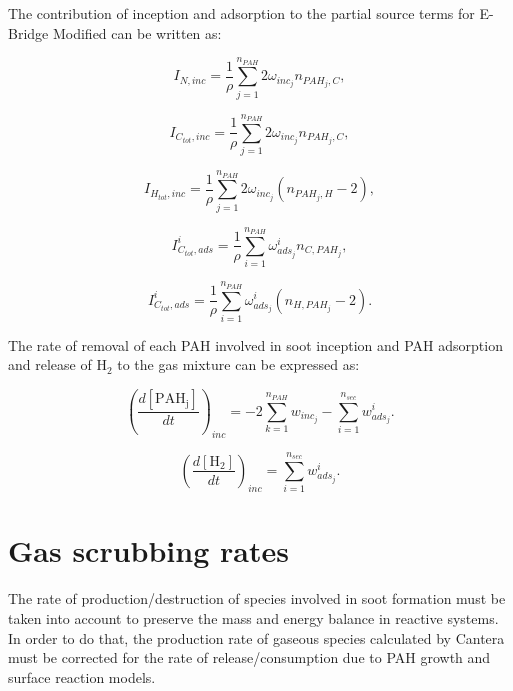 The contribution of inception and adsorption to the partial source terms for E-Bridge Modified can be written as:

\begin{equation}
	I_{N,{inc}} = \frac{1}{\rho}
	\sum_{j=1}^{n_{PAH}}
	2\omega_{inc_{j}} 
	n_{PAH_j,C}
	\label{eqn:IN_inc_ebri},
\end{equation}

\begin{equation}
	I_{C_{tot},{inc}} = \frac{1}{\rho}
	\sum_{j=1}^{n_{PAH}}
	2\omega_{inc_{j}} 
	n_{PAH_j,C}
	\label{eqn:ICtot_inc_ebri},
\end{equation}

\begin{equation}
	I_{H_{tot},{inc}} = \frac{1}{\rho}
	\sum_{j=1}^{n_{PAH}}
	2\omega_{inc_{j}} 
	\left(
	n_{PAH_j,H}-2
	\right)
	\label{eqn:IHtot_inc_ebri},
\end{equation}

\begin{equation}
	I^i_{C_{tot},ads} =
	\frac{1}{\rho}
	\sum_{i=1}^{n_{PAH}}
	\omega^i_{ads_j}
	n_{C,PAH_j}
	\label{eqn:ICtotads_ebri},
\end{equation}

\begin{equation}
	I^i_{C_{tot},ads} =
	\frac{1}{\rho}
	\sum_{i=1}^{n_{PAH}}
	\omega^i_{ads_j}
	\left(n_{H,PAH_j}-2\right)
	\label{eqn:IHtotads_ebri}.
\end{equation}

The rate of removal of each PAH involved in soot inception and PAH adsorption and release of $\mathrm{H_2}$ to the gas mixture can be expressed as:

\begin{equation}
	\left(
	\frac{d\left[{\mathrm{PAH_j}}\right]}{dt}
	\right)_{inc}
	= 
	-2\sum_{k=1}^{n_{PAH}}w_{inc_{j}}-\sum_{i=1}^{n_{sec}}w^i_{ads_j}
	\label{eqn:PAHscrub_ebri}.
\end{equation}

\begin{equation}
	\left(
	\frac{d\left[{\mathrm{H_2}}\right]}{dt}
	\right)_{inc}
	= 
	\sum_{i=1}^{n_{sec}}w^i_{ads_j}
	\label{eqn:H2scrub_ebri}.
\end{equation}

\section{Gas scrubbing rates}

The rate of production/destruction of species involved in soot formation must be taken into account to preserve the mass and energy balance in reactive systems. In order to do that, the production rate of gaseous species calculated by Cantera must be corrected for the rate of release/consumption due to PAH growth and surface reaction models.

